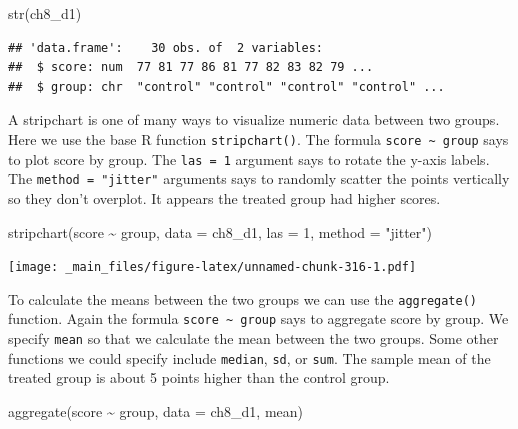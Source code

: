 \documentclass[
]{book}
\newenvironment{Shaded}{\begin{snugshade}}{\end{snugshade}}
\newcommand{\AttributeTok}[1]{\textcolor[rgb]{0.77,0.63,0.00}{#1}}
\newcommand{\DecValTok}[1]{\textcolor[rgb]{0.00,0.00,0.81}{#1}}
\newcommand{\FunctionTok}[1]{\textcolor[rgb]{0.00,0.00,0.00}{#1}}
\newcommand{\NormalTok}[1]{#1}
\newcommand{\SpecialCharTok}[1]{\textcolor[rgb]{0.00,0.00,0.00}{#1}}
\newcommand{\StringTok}[1]{\textcolor[rgb]{0.31,0.60,0.02}{#1}}
\begin{document}
\begin{Shaded}
\begin{Highlighting}[]
\FunctionTok{str}\NormalTok{(ch8\_d1)}
\end{Highlighting}
\end{Shaded}

\begin{verbatim}
## 'data.frame':    30 obs. of  2 variables:
##  $ score: num  77 81 77 86 81 77 82 83 82 79 ...
##  $ group: chr  "control" "control" "control" "control" ...
\end{verbatim}

A stripchart is one of many ways to visualize numeric data between two groups. Here we use the base R function \texttt{stripchart()}. The formula \texttt{score\ \textasciitilde{}\ group} says to plot score by group. The \texttt{las\ =\ 1} argument says to rotate the y-axis labels. The \texttt{method\ =\ "jitter"} arguments says to randomly scatter the points vertically so they don't overplot. It appears the treated group had higher scores.

\begin{Shaded}
\begin{Highlighting}[]
\FunctionTok{stripchart}\NormalTok{(score }\SpecialCharTok{\textasciitilde{}}\NormalTok{ group, }\AttributeTok{data =}\NormalTok{ ch8\_d1, }\AttributeTok{las =} \DecValTok{1}\NormalTok{, }\AttributeTok{method =} \StringTok{"jitter"}\NormalTok{)}
\end{Highlighting}
\end{Shaded}

\texttt{[image: \_main\_files/figure-latex/unnamed-chunk-316-1.pdf]}

To calculate the means between the two groups we can use the \texttt{aggregate()} function. Again the formula \texttt{score\ \textasciitilde{}\ group} says to aggregate score by group. We specify \texttt{mean} so that we calculate the mean between the two groups. Some other functions we could specify include \texttt{median}, \texttt{sd}, or \texttt{sum}. The sample mean of the treated group is about 5 points higher than the control group.

\begin{Shaded}
\begin{Highlighting}[]
\FunctionTok{aggregate}\NormalTok{(score }\SpecialCharTok{\textasciitilde{}}\NormalTok{ group, }\AttributeTok{data =}\NormalTok{ ch8\_d1, mean)}
\end{Highlighting}
\end{Shaded}
\end{document}

